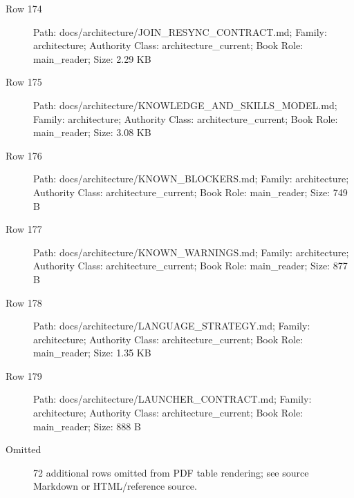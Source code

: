 \documentclass[9pt,a4paper]{book}
\begin{document}
\begin{description}
\item[Row 174] Path: docs/\allowbreak{}architecture/\allowbreak{}JOIN\_\allowbreak{}RESYNC\_\allowbreak{}CONTRACT.\allowbreak{}md; Family: architecture; Authority Class: architecture\_\allowbreak{}current; Book Role: main\_\allowbreak{}reader; Size: 2.\allowbreak{}29 KB
\item[Row 175] Path: docs/\allowbreak{}architecture/\allowbreak{}KNOWLEDGE\_\allowbreak{}AND\_\allowbreak{}SKILLS\_\allowbreak{}MODEL.\allowbreak{}md; Family: architecture; Authority Class: architecture\_\allowbreak{}current; Book Role: main\_\allowbreak{}reader; Size: 3.\allowbreak{}08 KB
\item[Row 176] Path: docs/\allowbreak{}architecture/\allowbreak{}KNOWN\_\allowbreak{}BLOCKERS.\allowbreak{}md; Family: architecture; Authority Class: architecture\_\allowbreak{}current; Book Role: main\_\allowbreak{}reader; Size: 749 B
\item[Row 177] Path: docs/\allowbreak{}architecture/\allowbreak{}KNOWN\_\allowbreak{}WARNINGS.\allowbreak{}md; Family: architecture; Authority Class: architecture\_\allowbreak{}current; Book Role: main\_\allowbreak{}reader; Size: 877 B
\item[Row 178] Path: docs/\allowbreak{}architecture/\allowbreak{}LANGUAGE\_\allowbreak{}STRATEGY.\allowbreak{}md; Family: architecture; Authority Class: architecture\_\allowbreak{}current; Book Role: main\_\allowbreak{}reader; Size: 1.\allowbreak{}35 KB
\item[Row 179] Path: docs/\allowbreak{}architecture/\allowbreak{}LAUNCHER\_\allowbreak{}CONTRACT.\allowbreak{}md; Family: architecture; Authority Class: architecture\_\allowbreak{}current; Book Role: main\_\allowbreak{}reader; Size: 888 B
\item[Omitted] 72 additional rows omitted from PDF table rendering; see source Markdown or HTML/\allowbreak{}reference source.\allowbreak{}
\end{description}
\end{document}
